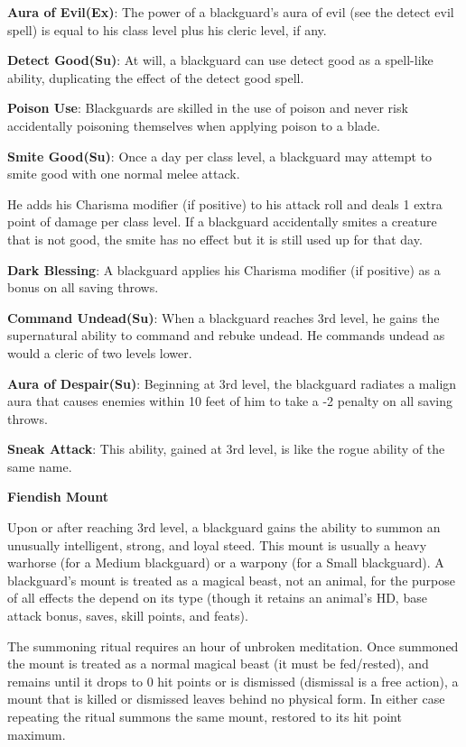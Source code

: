 \textbf{Aura of Evil(Ex)}: The power of a blackguard's aura of evil (see the detect evil spell) is equal to his class level plus his cleric level, if any.

\textbf{Detect Good(Su)}: At will, a blackguard can use detect good as a spell-like ability, duplicating the effect of the detect good spell.

\textbf{Poison Use}: Blackguards are skilled in the use of poison and never risk accidentally poisoning themselves when applying poison to a blade.

\textbf{Smite Good(Su)}: Once a day per class level, a blackguard may attempt to smite good with one normal melee attack.

He adds his Charisma modifier (if positive) to his attack roll and deals 1 extra point of damage per class level. If a blackguard accidentally smites a creature that is not good, the smite has no effect but it is still used up for that day.

\textbf{Dark Blessing}: A blackguard applies his Charisma modifier (if positive) as a bonus on all saving throws.

\textbf{Command Undead(Su)}: When a blackguard reaches 3rd level, he gains the supernatural ability to command and rebuke undead. He commands undead as would a cleric of two levels lower.

\textbf{Aura of Despair(Su)}: Beginning at 3rd level, the blackguard radiates a malign aura that causes enemies within 10 feet of him to take a -2 penalty on all saving throws.

\textbf{Sneak Attack}: This ability, gained at 3rd level, is like the rogue ability of the same name. 

\textbf{\large{Fiendish Mount}}

Upon or after reaching 3rd level, a blackguard gains the ability to summon an unusually intelligent, strong, and loyal steed. This mount is usually a heavy warhorse (for a Medium blackguard) or a warpony (for a Small blackguard). A blackguard's mount is treated as a magical beast, not an animal, for the purpose of all effects the depend on its type (though it retains an animal's HD, base attack bonus, saves, skill points, and feats).

The summoning ritual requires an hour of unbroken meditation. Once summoned the mount is treated as a normal magical beast (it must be fed/rested), and remains until it drops to 0 hit points or is dismissed (dismissal is a free action), a mount that is killed or dismissed leaves behind no physical form. In either case repeating the ritual summons the same mount, restored to its hit point maximum.

